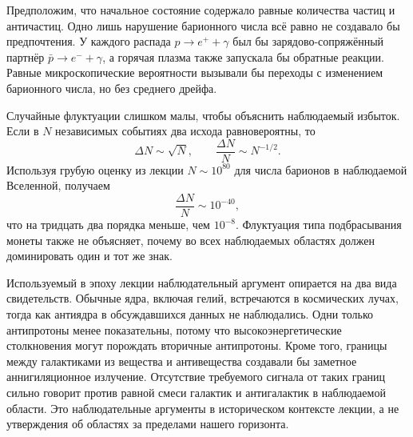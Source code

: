 Предположим, что начальное состояние содержало равные количества частиц и античастиц. Одно лишь нарушение барионного числа всё равно не создавало бы предпочтения. У каждого распада \(p\to e^++\gamma\) был бы зарядово-сопряжённый партнёр \(\bar p\to e^-+\gamma\), а горячая плазма также запускала бы обратные реакции. Равные микроскопические вероятности вызывали бы переходы с изменением барионного числа, но без среднего дрейфа.

\begin{classroomqa}
\end{classroomqa}

Случайные флуктуации слишком малы, чтобы объяснить наблюдаемый избыток. Если в \(N\) независимых событиях два исхода равновероятны, то
\begin{equation}
\Delta N\sim\sqrt N,
\qquad
\frac{\Delta N}{N}\sim N^{-1/2}.
\end{equation}
Используя грубую оценку из лекции \(N\sim10^{80}\) для числа барионов в наблюдаемой Вселенной, получаем
\begin{equation}
\frac{\Delta N}{N}\sim10^{-40},
\end{equation}
что на тридцать два порядка меньше, чем \(10^{-8}\). Флуктуация типа подбрасывания монеты также не объясняет, почему во всех наблюдаемых областях должен доминировать один и тот же знак.

\begin{classroomqa}
\end{classroomqa}

Используемый в эпоху лекции наблюдательный аргумент опирается на два вида свидетельств. Обычные ядра, включая гелий, встречаются в космических лучах, тогда как антиядра в обсуждавшихся данных не наблюдались. Одни только антипротоны менее показательны, потому что высокоэнергетические столкновения могут порождать вторичные антипротоны. Кроме того, границы между галактиками из вещества и антивещества создавали бы заметное аннигиляционное излучение. Отсутствие требуемого сигнала от таких границ сильно говорит против равной смеси галактик и антигалактик в наблюдаемой области. Это наблюдательные аргументы в историческом контексте лекции, а не утверждения об областях за пределами нашего горизонта.

